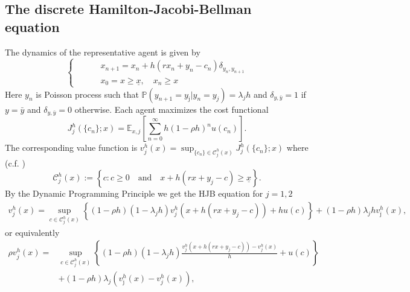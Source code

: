 \documentclass[11pt]{article}
\numberwithin{equation}{section}
\theoremstyle{Claim}
\newcommand{\EE}{\mathbb{E}}
\newcommand{\PP}{\mathbb{P}}
\newcommand{\mC}{\mathcal C}
\def\bjm{{\bar{\jmath}}}
\newcommand{\ux}{{\underline x}}
\theoremstyle{plain}
\newcommand{\D}{\Delta}
\begin{document}
\subsection{The discrete Hamilton-Jacobi-Bellman equation}
The dynamics of the representative agent is given by
\begin{equation}\label{eq:discrete_dynamics}
\left\{\begin{aligned}
\qquad & x_{n+1}=x_n+h(rx_n+y_n-c_n)\delta_{y_n,y_{n+1}}\\
&		x_0=x\ge \ux,\quad x_n\geq x
\end{aligned}\right.
\end{equation}
Here $y_n$ is Poisson process such that $\PP(y_{n+1}=y_\bjm|y_n=y_j)=\lambda_j h$ and
$\delta_{y,\bar y}=1$ if $y=\bar y$ and  $\delta_{y,\bar y}=0$ otherwise. Each agent  maximizes the cost functional 
\begin{equation*}
J^{h}_{j} (\{c_n\}; x)=\EE_{x,j}\left[	\sum_{n=0}^\infty h(1-\rho h)^n u(c_n)\right].
\end{equation*}
The corresponding value function is
$
	v^{h}_{j}(x)=\sup_{\{c_n\}\in\mC_j^h(x)}J^{h}_{j} (\{c_n\}; x)
$
where (c.f. \cite[Eq. (3.2)]{achdou2022simulating})
\begin{equation}\label{C set}
\mC^{h}_{j}(x):=\left\{{c}: c\ge 0\quad\text{and}\quad x+h(rx+y_j-c) \ge \ux \right\}.
\end{equation}
By   the Dynamic Programming Principle we get the HJB equation for $j=1,2$
\begin{equation}\label{eq:HJBh_1}
\begin{aligned}
	v^{h}_{j}(x)
	=\sup_{c\in \mC^{h}_{j}(x)}\left\{
	(1-\rho h)(1-\lambda_jh)v^{h}_{j}(x+h(rx+y_j-c))+ hu(c) 
	\right\}+(1-\rho h)\lambda_j hv^{h}_{\bar \jmath}(x),
	\end{aligned}
\end{equation}
or equivalently
\begin{equation}\label{eq:HJBh_2}
\begin{aligned}
\rho v^{h}_{j}(x)
={}&\sup_{c\in \mC^{h}_{j}(x)}\left\{ 
		(1-\rho h)  (1-\lambda_jh)\frac{v^{h}_{j}(x+h(rx+y_j-c))-v^{h}_{j}(x)}{h}+u(c)\right\}\\
		&+(1-\rho h)\lambda_j (v^{h}_{\bar \jmath}(x)-v^{h}_{j}(x)) , 
\end{aligned}
\end{equation}
\end{document}
